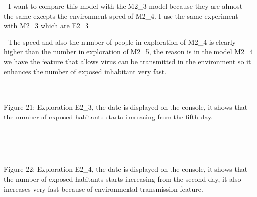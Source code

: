 \documentclass{article}
\begin{document}
\begin{pic15}
\begin{pic15}
\raggedright- I want to compare this model with the M2\_3 model because they are almost the same excepts the environment spred of M2\_4. I use the same experiment with M2\_3 which are E2\_3
\\
\raggedright- The speed and also the number of people in exploration of M2\_4 is clearly higher than the number in exploration of M2\_5, the reason is in the model M2\_4 we have the feature that allows virus can be transmitted in the environment so it enhances the number of exposed inhabitant very fast.
\\\\
\begin{pic21}
\\
\caption{Figure 21: Exploration E2\_3, the date is displayed on the console, it shows that the number of exposed habitants starts increasing from the fifth day.} 
\end{pic21}
\\\\
\begin{pic22}
\\
\caption{Figure 22: Exploration E2\_4, the date is displayed on the console, it shows that the number of exposed habitants starts increasing from the second day, it also increases very fast because of environmental transmission feature.} 
\end{pic22}
\\

\end{pic15}
\end{pic15}
\end{document}
